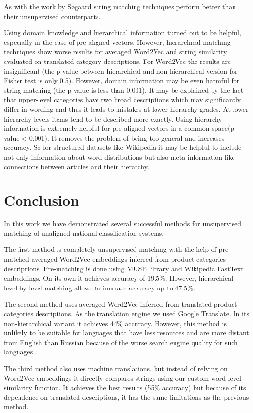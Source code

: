 \documentclass[conference]{IEEEtran}
\begin{document}
As with the work by Søgaard string matching techniques perform better than their unsupervised counterparts.

Using domain knowledge and hierarchical information turned out to be helpful, especially in the case of pre-aligned vectors. However, hierarchical matching techniques show worse results for averaged Word2Vec and string similarity evaluated on translated category descriptions. For Word2Vec the results are insignificant (the p-value between hierarchical and non-hierarchical version for Fisher test is only 0.5). However, domain information may be even harmful for string matching (the p-value is less than 0.001). It may be explained by the fact that upper-level categories have two broad descriptions which may significantly differ in wording and thus it leads to mistakes at lower hierarchy grades. At lower hierarchy levels items tend to be described more exactly. Using hierarchy information is extremely helpful for pre-aligned vectors in a common space(p-value < 0.001). It removes the problem of being too general and increases accuracy. So for structured datasets like Wikipedia it may be helpful to include not only information about word distributions but also meta-information like connections between articles and their hierarchy.

\section{Conclusion}
In this work we have demonstrated several successful methods for unsupervised matching of unaligned national classification systems. 

The first method is completely unsupervised matching with the help of pre-matched averaged Word2Vec embeddings inferred from product categories descriptions. Pre-matching is done using MUSE library and Wikipedia FastText embeddings. On its own it achieves accuracy of 19.5\%. However, hierarchical level-by-level matching allows to increase accuracy up to 47.5\%.

The second method uses averaged Word2Vec inferred from translated product categories descriptions. As the translation engine we used Google Translate. In its non-hierarchical variant it achieves 44\% accuracy. However, this method is unlikely to be suitable for languages that have less resources and are more distant from English than Russian because of the worse search engine quality for such languages \cite{google-translate-rare}.

The third method also uses machine translations, but instead of relying on Word2Vec embeddings it directly compares strings using our custom word-level similarity function. It achieves the best results (55\% accuracy) but because of its dependence on translated descriptions, it has the same limitations as the previous method.
\end{document}
